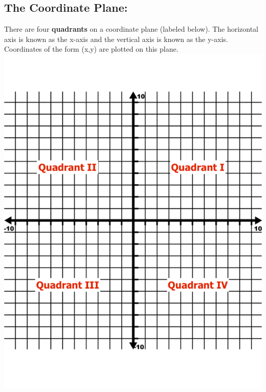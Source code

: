 \documentclass[11pt]{article}
\theoremstyle{definition}
\theoremstyle{remark}
\begin{document}
\subsection{The Coordinate Plane:} There are four \textbf{quadrants} on a coordinate plane (labeled below). The horizontal axis is known as the x-axis and the vertical axis is known as the y-axis. Coordinates of the form (x,y) are plotted on this plane. \\
\includegraphics[scale=0.3, trim=-450 100 0 50]{img/coordplan_quadlab.pdf}
\end{document}
